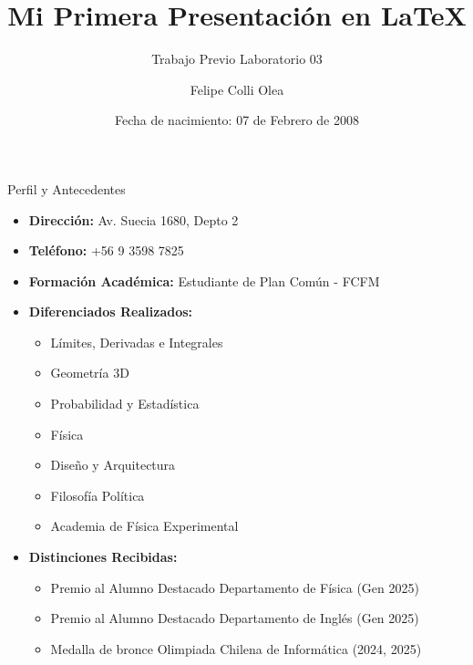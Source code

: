\documentclass{beamer}
\title{Mi Primera Presentación en \LaTeX}
\subtitle{Trabajo Previo Laboratorio 03}
\author{Felipe Colli Olea}
\date{Fecha de nacimiento: 07 de Febrero de 2008} %
\begin{document}
\begin{frame}
	\titlepage
\end{frame}

\begin{frame}{Perfil y Antecedentes}
	\begin{itemize}
		\item \textbf{Dirección:} Av. Suecia 1680, Depto 2
		\item \textbf{Teléfono:} +56 9 3598 7825
		\item \textbf{Formación Académica:} Estudiante de Plan Común - FCFM
		\item \textbf{Diferenciados Realizados:}
		      \begin{itemize}
			      \item Límites, Derivadas e Integrales
			      \item Geometría 3D
			      \item Probabilidad y Estadística
			      \item Física
			      \item Diseño y Arquitectura
			      \item Filosofía Política
			      \item Academia de Física Experimental
		      \end{itemize}
		\item \textbf{Distinciones Recibidas:}
		      \begin{itemize}
			      \item Premio al Alumno Destacado Departamento de Física (Gen 2025)
			      \item Premio al Alumno Destacado Departamento de Inglés (Gen 2025)
			      \item Medalla de bronce Olimpiada Chilena de Informática (2024, 2025)
		      \end{itemize}
	\end{itemize}
\end{frame}
\end{document}
